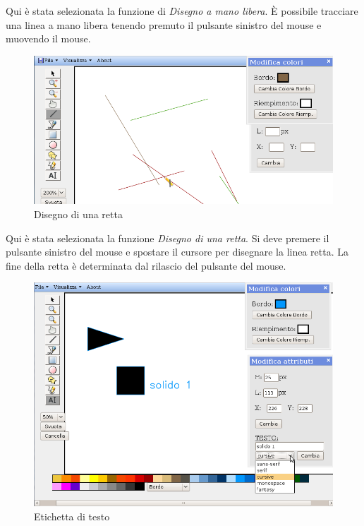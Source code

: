  
 
\vspace{100pt}
Qui \`e stata selezionata la funzione di \textit{Disegno a mano libera}. \`E possibile tracciare una linea a mano libera tenendo premuto il pulsante sinistro del mouse e muovendo il mouse.
\newpage
 
 
\begin{figure}[!ht]
\centering
\includegraphics[scale=0.5]{images/linea.png}
\caption{Disegno di una retta}
\end{figure}
 
 
\vspace{100pt}
Qui \`e stata selezionata la funzione \textit{Disegno di una retta}. Si deve premere il pulsante sinistro del mouse e spostare il cursore per disegnare la linea retta. La fine della retta \`e determinata dal rilascio del pulsante del mouse.
 
\newpage
 
\begin{figure}[!ht]
\centering
\includegraphics[scale=0.5]{images/label.png}
\caption{Etichetta di testo}
\end{figure}
 
